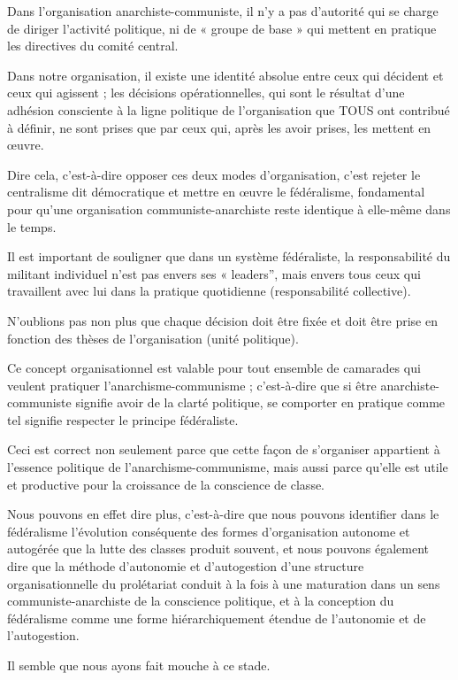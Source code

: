 Dans l'organisation anarchiste-communiste, il n'y a pas d'autorité qui se charge de diriger l'activité politique, ni de « groupe de base » qui mettent en pratique les directives du comité central.

Dans notre organisation, il existe une identité absolue entre ceux qui décident et ceux qui agissent ; les décisions opérationnelles, qui sont le résultat d'une adhésion consciente à la ligne politique de l'organisation que TOUS ont contribué à définir, ne sont prises que par ceux qui, après les avoir prises, les mettent en œuvre.

Dire cela, c'est-à-dire opposer ces deux modes d'organisation, c'est rejeter le centralisme dit démocratique et mettre en œuvre le fédéralisme, fondamental pour qu'une organisation communiste-anarchiste reste identique à elle-même dans le temps.

Il est important de souligner que dans un système fédéraliste, la responsabilité du militant individuel n'est pas envers ses « leaders'', mais envers tous ceux qui travaillent avec lui dans la pratique quotidienne (responsabilité collective).

N'oublions pas non plus que chaque décision doit être fixée et doit être prise en fonction des thèses de l'organisation (unité politique).

Ce concept organisationnel est valable pour tout ensemble de camarades qui veulent pratiquer l'anarchisme-communisme ; c'est-à-dire que si être anarchiste-communiste signifie avoir de la clarté politique, se comporter en pratique comme tel signifie respecter le principe fédéraliste.

Ceci est correct non seulement parce que cette façon de s'organiser appartient à l'essence politique de l'anarchisme-communisme, mais aussi parce qu'elle est utile et productive pour la croissance de la conscience de classe.

Nous pouvons en effet dire plus, c'est-à-dire que nous pouvons identifier dans le fédéralisme l'évolution conséquente des formes d'organisation autonome et autogérée que la lutte des classes produit souvent, et nous pouvons également dire que la méthode d'autonomie et d'autogestion d'une structure organisationnelle du prolétariat conduit à la fois à une maturation dans un sens communiste-anarchiste de la conscience politique, et à la conception du fédéralisme comme une forme hiérarchiquement étendue de l'autonomie et de l'autogestion.

Il semble que nous ayons fait mouche à ce stade.

